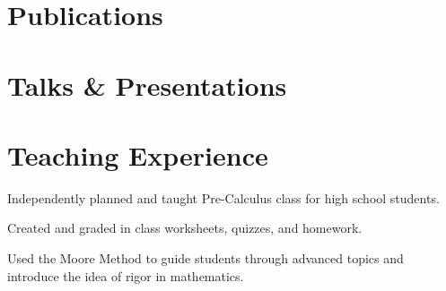 \documentclass{cultvoucher}
\begin{document}
\vspace{-0.3\topsep}

\raggedright
{}
\begin{paracol}{2}

\section{Publications}



\switchcolumn


\section{Talks \& Presentations}

\end{paracol}
\vspace{-2\topsep}


\section{Teaching Experience}
\begin{tightitemize}
	\item Independently planned and taught Pre-Calculus class for high school students.
	\item Created and graded in class worksheets, quizzes, and homework.
	\item Used the Moore Method to guide students through advanced topics and introduce the idea of rigor in mathematics.
\end{tightitemize}
\vspace{\topsep}
\end{document}
